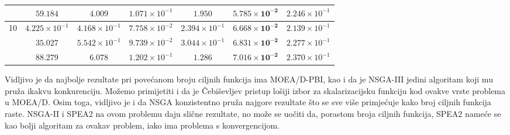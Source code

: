 \documentclass[times, utf8, zavrsni, numeric]{fer}
\begin{document}
\begin{table}[htb]
\begin{tabular}{c|c|c|c|c|c|c}
                    & $59.184$                  & $4.009$               & $1.071\times 10^{-1}$ & $1.950$               & $\mathbf{5.785\times 10^{-2}}$ & $2.246\times 10^{-1}$\\ \hline
\multirow{3}{*}{10} & $4.225\times 10^{-1}$     & $4.168\times 10^{-1}$ & $7.758\times 10^{-2}$ & $2.394\times 10^{-1}$ & $\mathbf{6.668\times 10^{-2}}$ & $2.139\times 10^{-1}$\\
			        & $35.027$                  & $5.542\times 10^{-1}$ & $9.739\times 10^{-2}$ & $3.044\times 10^{-1}$ & $\mathbf{6.831\times 10^{-2}}$ & $2.277\times 10^{-1}$\\
                    & $88.279$                  & $6.078$               & $1.202\times 10^{-1}$ & $1.286$               & $\mathbf{7.016\times 10^{-2}}$ & $2.370\times 10^{-1}$\\ \hline
\end{tabular}
\end{table}

Vidljivo je da najbolje rezultate pri povećanom broju ciljnih funkcija ima MOEA/D-PBI, kao i da je NSGA-III jedini algoritam koji mu pruža ikakvu konkurenciju. Možemo primijetiti i da je Čebiševljev pristup lošiji izbor za skalarizacijsku funkciju kod ovakve vrste problema u MOEA/D. Osim toga, vidljivo je i da NSGA konzistentno pruža najgore rezultate što se sve više primjećuje kako broj ciljnih funkcija raste. NSGA-II i SPEA2 na ovom problemu daju slične rezultate, no može se uočiti da, porastom broja ciljnih funkcija, SPEA2 nameće se kao bolji algoritam za ovakav problem, iako ima problema s konvergencijom. 

\FloatBarrier
\end{document}
